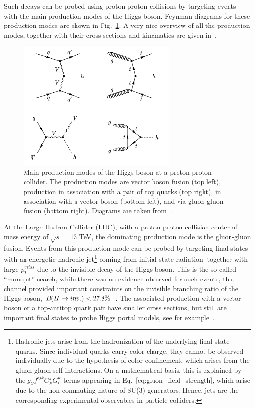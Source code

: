 Such decays can be probed using proton-proton collisions by targeting events with the main production modes of the Higgs boson. Feynman diagrams for these production 
modes are shown in Fig.~\ref{fig:all_higgs_prod}. A very nice overview of all the production modes, 
together with their cross sections and kinematics are given in~\cite{Djouadi:2005gi}.

\begin{figure}
    \centering
    \includegraphics[width=0.7\textwidth]{all_higgs_prod.png}    
    \caption{Main production modes of the Higgs boson at a proton-proton collider. The production modes are vector boson fusion (top left), production in association with
    a pair of top quarks (top right), in association with a vector boson (bottom left), and via gluon-gluon fusion (bottom right). Diagrams are taken from~\cite{Argyropoulos:2021sav}.}
    \label{fig:all_higgs_prod}
\end{figure}

At the Large Hadron Collider (LHC), with a proton-proton collision center of mass energy of $\sqrt{s} = 13$ TeV, the dominating production mode is the gluon-gluon fusion. Events from 
this production mode can be probed by targeting final states with an energetic hadronic jet\footnote{Hadronic jets arise from the hadronization of the
underlying final state quarks. Since individual quarks carry color charge, they cannot be observed individually due to the hypothesis of color confinement,
which arises from the gluon-gluon self interactions. On a mathematical basis, this is explained by the $g_{S} f^{ijk} G_{\mu}^{j} G_{\nu}^{k}$ terms appearing in 
Eq.~\ref{eq:gluon_field_strength}, which arise due to the non-commuting nature of SU(3) generators. Hence, jets are the corresponding 
experimental observables in particle colliders.} 
coming from initial state radiation, together with large $p_T^{miss}$ due to the invisible decay
of the Higgs boson. This is the so called ``monojet'' search, while there was no evidence observed for such events, this channel provided important constraints on the invisible
branching ratio of the Higgs boson, $B(H \rightarrow inv.) < 27.8\%$~\cite{CMS:2021far}. The associated production with a vector boson or a top-antitop quark pair have smaller cross sections,
but still are important final states to probe Higgs portal models, see for example~\cite{CMS:2023sdw}.

